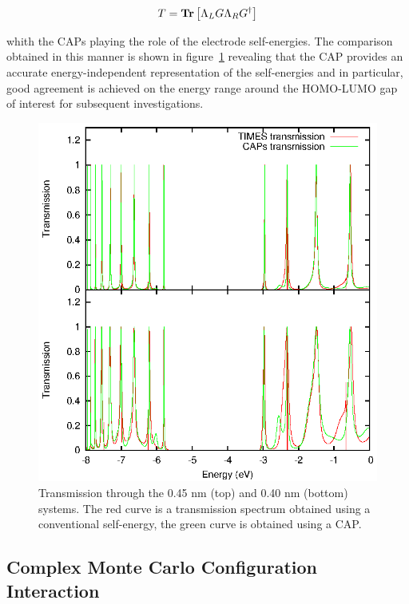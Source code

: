 \begin{equation}
  T = \mathbf{Tr} \left[ \Lambda_L G \Lambda_R G^\dagger \right]
  \label{eq:transmfromG}
\end{equation}

whith the \acp{CAP} playing the role of the electrode self-energies.
The comparison obtained in this manner is shown in
figure~\ref{fig:transdat} revealing that the \ac{CAP} provides an
accurate energy-independent representation of the self-energies and in
particular, good agreement is achieved on the energy range around the
\ac{HOMO}-\ac{LUMO} gap of interest for subsequent investigations.

\begin{figure} 
	\begin{center}
		\includegraphics[width=0.9\linewidth]{figures/transdat.eps}
	\end{center}
	\caption{Transmission through the 0.45 nm (top) and 0.40 nm (bottom)
	         systems. The red curve is a transmission spectrum obtained
		 using a conventional self-energy, the green curve is obtained
		 using a \ac{CAP}.}
	\label{fig:transdat}
\end{figure}

\subsection{Complex Monte Carlo Configuration Interaction}

